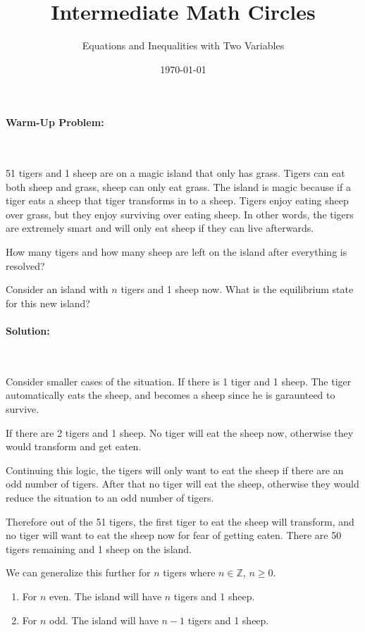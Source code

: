 \documentclass[english,12pt]{article}
\title{Intermediate Math Circles}
\author{Equations and Inequalities with Two Variables}
\date{\today}
\theoremstyle{plain}
\theoremstyle{definition}
\theoremstyle{definition} %
\newcommand{\enum}[1]{\begin{enumerate} #1 \end{enumerate}}
\begin{document}
  \maketitle 
\paragraph{Warm-Up Problem:}\

51 tigers and 1 sheep are on a magic island that only has grass.  Tigers can eat both sheep and grass, sheep can only eat grass.  The island is magic because if a tiger eats a sheep that tiger transforms in to a sheep.  Tigers enjoy eating sheep over grass, but they enjoy surviving over eating sheep.  In other words, the tigers are extremely smart and will only eat sheep if they can live afterwards.  

How many tigers and how many sheep are left on the island after everything is resolved?

Consider an island with $n$ tigers and 1 sheep now.  What is the equilibrium state for this new island?\\

\paragraph{Solution:}\

Consider smaller cases of the situation.  If there is 1 tiger and 1 sheep.  The tiger automatically eats the sheep, and becomes a sheep since he is garaunteed to survive.

If there are 2 tigers and 1 sheep.  No tiger will eat the sheep now, otherwise they would transform and get eaten.

Continuing this logic, the tigers will only want to eat the sheep if there are an odd number of tigers. After that no tiger will eat the sheep, otherwise they would reduce the situation to an odd number of tigers.

Therefore out of the 51 tigers, the first tiger to eat the sheep will transform, and no tiger will want to eat the sheep now for fear of getting eaten.  There are 50 tigers remaining and 1 sheep on the island.

We can generalize this further for $n$ tigers where $n\in\mathbb{Z}$, $n\geq 0$.
\enum{
\item For $n$ even.  The island will have $n$ tigers and 1 sheep.
\item For $n$ odd.  The island will have $n-1$ tigers and 1 sheep.
}
\pagebreak
\end{document}
